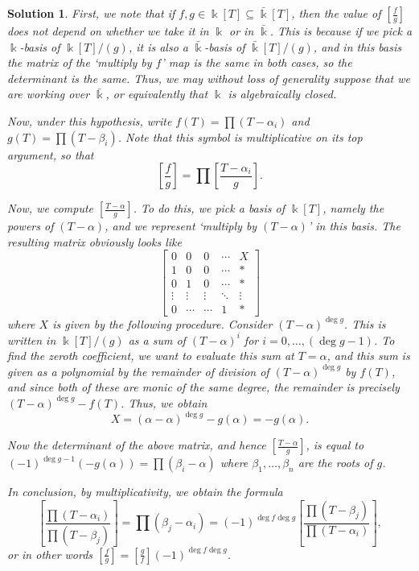 \documentclass{article}
\theoremstyle{nonumberplain}
\newtheorem{sol}{Solution}
\newcommand{\kk}{\Bbbk}
\newcommand{\blegendre}[2]{\genfrac{[}{]}{}{}{#1}{#2}}
\begin{document}
\begin{sol}
First, we note that if $f, g \in \kk[T] \subseteq \bar\kk[T]$, then the value of $\blegendre f g$ does not depend on whether we take it in $\kk$ or in $\bar\kk$. This is because if we pick a $\kk$-basis of $\kk[T]/(g)$, it is also a $\bar\kk$-basis of $\bar\kk[T]/(g)$, and in this basis the matrix of the `multiply by $f$' map is the same in both cases, so the determinant is the same. Thus, we may without loss of generality suppose that we are working over $\bar\kk$, or equivalently that $\kk$ is algebraically closed.

Now, under this hypothesis, write $f(T) = \prod (T-\alpha_i)$ and $g(T) = \prod (T-\beta_i)$. Note that this symbol is multiplicative on its top argument, so that
\begin{equation}
\blegendre f g = \prod \blegendre{T-\alpha_i}g.
\end{equation}

Now, we compute $\blegendre{T-\alpha}g$. To do this, we pick a basis of $\kk[T]$, namely the powers of $(T-\alpha)$, and we represent `multiply by $(T-\alpha)$' in this basis. The resulting matrix obviously looks like
\begin{equation}
\begin{bmatrix}
0 & 0 & 0 & \cdots & X\\
1 & 0 & 0 & \cdots & * \\
0 & 1 & 0 & \cdots & * \\
\vdots & \vdots & \vdots & \ddots & \vdots \\
0 & \cdots & \cdots & 1 & *
\end{bmatrix}
\end{equation}
where $X$ is given by the following procedure. Consider $(T-\alpha)^{\deg g}$. This is written in $\kk[T]/(g)$ as a sum of $(T-\alpha)^i$ for $i = 0, \dots, (\deg g - 1)$. To find the zeroth coefficient, we want to evaluate this sum at $T = \alpha$, and this sum is given as a polynomial by the remainder of division of $(T-\alpha)^{\deg g}$ by $f(T)$, and since both of these are monic of the same degree, the remainder is precisely $(T-\alpha)^{\deg g} - f(T)$. Thus, we obtain
\begin{equation}
X = (\alpha-\alpha)^{\deg g} - g(\alpha) = - g(\alpha).
\end{equation}

Now the determinant of the above matrix, and hence $\blegendre{T-\alpha}g$, is equal to $(-1)^{\deg g - 1} (-g(\alpha)) = \prod (\beta_i - \alpha)$ where $\beta_1, \dots, \beta_n$ are the roots of $g$.

In conclusion, by multiplicativity, we obtain the formula
\begin{equation}
\blegendre{\prod (T - \alpha_i)}{\prod (T-\beta_j)} = \prod (\beta_j - \alpha_i) = (-1)^{\deg f \deg g} \blegendre{\prod (T-\beta_j)}{\prod(T-\alpha_i)},
\end{equation}
or in other words $\blegendre f g = \blegendre g f (-1)^{\deg f \deg g}$.
\end{sol}
\end{document}
